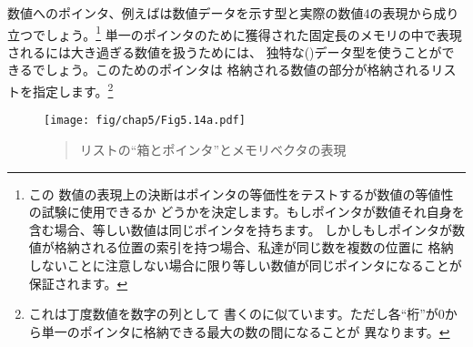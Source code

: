 数値へのポインタ、例えばは数値データを示す型と実際の数値4の表現から成り立つでしょう。\footnote{この
数値の表現上の決断はポインタの等価性をテストするが数値の等値性の試験に使用できるか
どうかを決定します。もしポインタが数値それ自身を含む場合、等しい数値は同じポインタを持ちます。
しかしもしポインタが数値が格納される位置の索引を持つ場合、私達が同じ数を複数の位置に
格納しないことに注意しない場合に限り等しい数値が同じポインタになることが保証されます。}
単一のポインタのために獲得された固定長のメモリの中で表現されるには大き過ぎる数値を扱うためには、
独特な()データ型を使うことができるでしょう。このためのポインタは
格納される数値の部分が格納されるリストを指定します。\footnote{これは丁度数値を数字の列として
書くのに似ています。ただし各``桁''が0から単一のポインタに格納できる最大の数の間になることが
異なります。}

\begin{figure}[tb]
\label{Figure 5.14}
\centering
\begin{comment}
\heading{Figure 5.14:} Box-and-pointer and memory-vector representations of the list \code{((1 2) 3 4)}.

\begin{example}
               +---+---+               +---+---+    +---+---+
((1 2) 3 4) -->| * | *-+-------------->| * | *-+--->| * | / |
               +-|-+---+               +-|-+---+    +-|-+---+
              1  |                    2  |         4  |
                 V                       V            V
               +---+---+    +---+---+  +---+        +---+
               | * | *-+--->| * | / |  | 3 |        | 4 |
               +-|-+---+    +-|-+---+  +---+        +---+
              5  |         7  |
                 V            V
               +---+        +---+
               | 1 |        | 2 |
               +---+        +---+

   Index   0    1    2    3    4    5    6    7    8    ...
         +----+----+----+----+----+----+----+----+----+----
the-cars |    | p5 | n3 |    | n4 | n1 |    | n2 |    | ...
         +----+----+----+----+----+----+----+----+----+----
the-cdrs |    | p2 | p4 |    | e0 | p7 |    | e0 |    | ...
         +----+----+----+----+----+----+----+----+----+----
\end{example}
\end{comment}
\texttt{[image: fig/chap5/Fig5.14a.pdf]}
\begin{quote}
 リストの``箱とポインタ''とメモリベクタの表現
\end{quote}
\end{figure}

